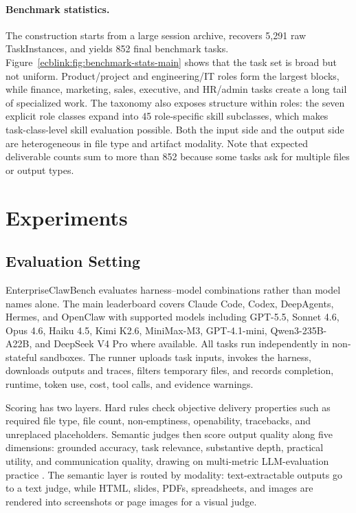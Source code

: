 \documentclass[11pt, a4paper, copyright, frontis]{frontis}
\newcommand{\ecb}{EnterpriseClawBench}
\newcommand{\hm}{harness--model}
\begin{document}
\paragraph{Benchmark statistics.}
The construction starts from a large session archive, recovers 5,291 raw TaskInstances, and yields 852 final benchmark tasks. Figure~\ref{ecblink:fig:benchmark-stats-main} shows that the task set is broad but not uniform. Product/project and engineering/IT roles form the largest blocks, while finance, marketing, sales, executive, and HR/admin tasks create a long tail of specialized work. The taxonomy also exposes structure within roles: the seven explicit role classes expand into 45 role-specific skill subclasses, which makes task-class-level skill evaluation possible. Both the input side and the output side are heterogeneous in file type and artifact modality. Note that expected deliverable counts sum to more than 852 because some tasks ask for multiple files or output types.



\section{Experiments}
\subsection{Evaluation Setting}
\ecb{} evaluates \hm{} combinations rather than model names alone. The main leaderboard covers Claude Code, Codex, DeepAgents, Hermes, and OpenClaw with supported models including GPT-5.5, Sonnet 4.6, Opus 4.6, Haiku 4.5, Kimi K2.6, MiniMax-M3, GPT-4.1-mini, Qwen3-235B-A22B, and DeepSeek V4 Pro where available. All tasks run independently in non-stateful sandboxes. The runner uploads task inputs, invokes the harness, downloads outputs and traces, filters temporary files, and records completion, runtime, token use, cost, tool calls, and evidence warnings.

Scoring has two layers. Hard rules check objective delivery properties such as required file type, file count, non-emptiness, openability, tracebacks, and unreplaced placeholders. Semantic judges then score output quality along five dimensions: grounded accuracy, task relevance, substantive depth, practical utility, and communication quality, drawing on multi-metric LLM-evaluation practice \mbox{\citep{helm2022,geval2023,ragas2023}}. The semantic layer is routed by modality: text-extractable outputs go to a text judge, while HTML, slides, PDFs, spreadsheets, and images are rendered into screenshots or page images for a visual judge.
\end{document}
